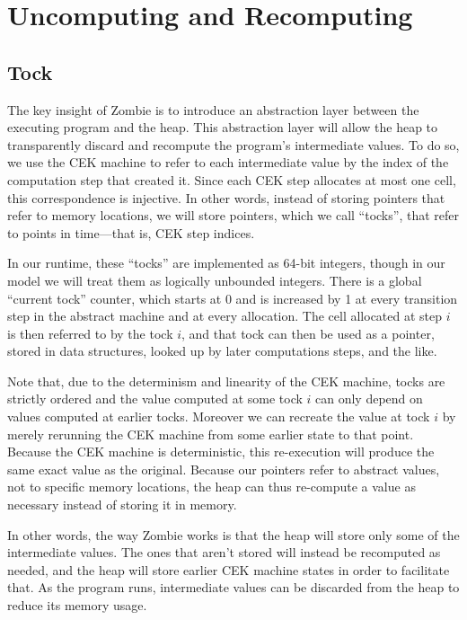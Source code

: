 \section{Uncomputing and Recomputing}
\subsection{Tock}
The key insight of Zombie is to introduce an abstraction layer between the executing program and the heap. This abstraction layer will allow the heap to transparently discard and recompute the program's intermediate values. To do so, we use the CEK machine to refer to each intermediate value by the index of the computation step that created it. Since each CEK step allocates at most one cell, this correspondence is injective. In other words, instead of storing pointers that refer to memory locations, we will store pointers, which we call ``tocks'', that refer to points in time---that is, CEK step indices.

In our runtime, these ``tocks'' are implemented as 64-bit integers, though in our model we will treat them as logically unbounded integers. There is a global ``current tock'' counter, which starts at 0 and is increased by 1 at every transition step in the abstract machine and at every allocation. The cell allocated at step $i$ is then referred to by the tock $i$, and that tock can then be used as a pointer, stored in data structures, looked up by later computations steps, and the like.

Note that, due to the determinism and linearity of the CEK machine, tocks are strictly ordered and the value computed at some tock $i$ can only depend on values computed at earlier tocks. Moreover we can recreate the value at tock $i$ by merely rerunning the CEK machine from some earlier state to that point. Because the CEK machine is deterministic, this re-execution will produce the same exact value as the original. Because our pointers refer to abstract values, not to specific memory locations, the heap can thus re-compute a value as necessary instead of storing it in memory.

In other words, the way Zombie works is that the heap will store only some of the intermediate values. The ones that aren't stored will instead be recomputed as needed, and the heap will store earlier CEK machine states in order to facilitate that. As the program runs, intermediate values can be discarded from the heap to reduce its memory usage.

